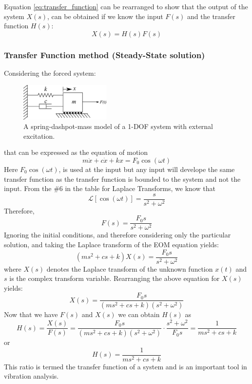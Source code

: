 \documentclass[12pt,letter]{article}
\numberwithin{ex}{section} %
\numberwithin{re}{section} %
\newcommand{\Laplace}[1]{\ensuremath{\mathcal{L}{\left[#1\right]}}}
\begin{document}
Equation \ref{eq:transfer_function} can be rearranged to show that the output of the system $X(s)$, can be obtained if we know the input $F(s)$ and the transfer function $H(s)$:
\begin{equation}
X(s) = H(s)F(s)
\end{equation}	


\subsubsection{Transfer Function method (Steady-State solution)}

Considering the forced system:
\begin{figure}[H]
	\centering
	\includegraphics[width=0.4\textwidth]{../Figures/forced_spring_mass_damper_system.png}
	\caption{A spring-dashpot-mass model of a 1-DOF system with external excitation.}
\end{figure}
\noindent that can be expressed as the equation of motion
\begin{equation}
	m\ddot{x} + c\dot{x} +kx = F_0 \cos(\omega t)
\end{equation}
Here $F_0 \cos(\omega t)$, is used at the input but any input will develope the same transfer function as the transfer function is bounded to the system and not the input. From the \#6 in the table for Laplace Transforms, we know that
\begin{equation}
	\Laplace{\cos(\omega t)} = \frac{s}{s^2+\omega^2}
\end{equation}
Therefore, 
\begin{equation}
F(s) = \frac{F_0s}{s^2+\omega^2}
\end{equation}
Ignoring the initial conditions, and therefore considering only the particular solution, and taking the Laplace transform of the EOM equation yields:
\begin{equation}
(ms^2 + cs +k)X(s) = \frac{F_0s}{s^2+\omega^2} 
\end{equation}
where $X(s)$ denotes the Laplace transform of the unknown function $x(t)$ and $s$ is the complex transform variable. Rearranging the above equation for $X(s)$ yields: 
\begin{equation}
X(s) = \frac{F_0s}{(ms^2 + cs +k)(s^2+\omega^2)}
\end{equation}
Now that we have $F(s)$ and $X(s)$ we can obtain $H(s)$ as  
\begin{equation}
H(s) = \frac{X(s)}{F(s)} = \frac{F_0s}{(ms^2 + cs +k)(s^2+\omega^2)} \cdot \frac{s^2+\omega^2}{F_0s} = \frac{1}{ms^2+cs+k}
\end{equation}
or 
\begin{equation}
H(s) = \frac{1}{ms^2+cs+k}
\end{equation}
This ratio is termed the transfer function of a system and is an important tool in vibration analysis.
\end{document}
